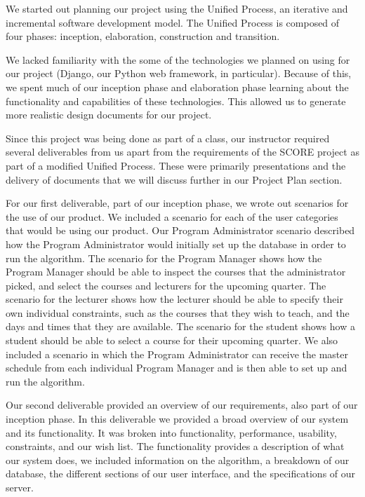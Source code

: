 \documentclass[12pt]{article}
\begin{document}
We started out planning our project using the Unified Process, an iterative and incremental software development model. The Unified Process is composed of four phases: inception, elaboration, construction and transition. 

We lacked familiarity with the some of the technologies we planned on using for our project (Django, our Python web framework, in particular). Because of this, we spent much of our inception phase and elaboration phase learning about the functionality and capabilities of these technologies. This allowed us to generate more realistic design documents for our project.

Since this project was being done as part of a class, our instructor required several deliverables from us apart from the requirements of the SCORE project as part of a modified Unified Process. These were primarily presentations and the delivery of documents that we will discuss further in our Project Plan section. 


For our first deliverable, part of our inception phase, we wrote out scenarios for the use of our product. We included a scenario for each of the user categories that would be using our product. Our Program Administrator scenario described how the Program Administrator would initially set up the database in order to run the algorithm. The scenario for the Program Manager shows how the Program Manager should be able to inspect the courses that the administrator picked, and select the courses and lecturers for the upcoming quarter. The scenario for the lecturer shows how the lecturer should be able to specify their own individual constraints, such as the courses that they wish to teach, and the days and times that they are available. The scenario for the student shows how a student should be able to select a course for their upcoming quarter. We also included a scenario in which the Program Administrator can receive the master schedule from each individual Program Manager and is then able to set up and run the algorithm.

Our second deliverable provided an overview of our requirements, also part of our inception phase. In this deliverable we provided a broad overview of our system and its functionality. It was broken into functionality, performance, usability, constraints, and our wish list. The functionality provides a description of what our system does, we included information on the algorithm, a breakdown of our database, the different sections of our user interface, and the specifications of our server.
\end{document}
